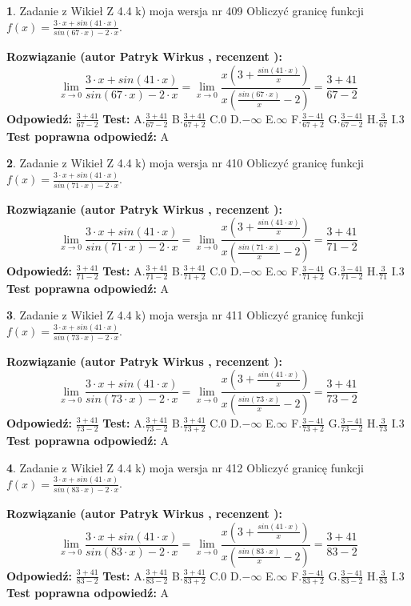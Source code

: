 \documentclass[12pt, a4paper]{article}
\theoremstyle{definition} %
\newtheorem{zad}{}
\newcommand{\zadStart}[1]{\begin{zad}#1\newline}
\newcommand{\zadStop}{\end{zad}}
\newcommand{\rozwStart}[2]{\noindent \textbf{Rozwiązanie (autor #1 , recenzent #2): }\newline}
\newcommand{\rozwStop}{\newline}
\newcommand{\odpStart}{\noindent \textbf{Odpowiedź:}\newline}
\newcommand{\odpStop}{\newline}
\newcommand{\testStart}{\noindent \textbf{Test:}\newline}
\newcommand{\testStop}{\newline}
\newcommand{\kluczStart}{\noindent \textbf{Test poprawna odpowiedź:}\newline}
\newcommand{\kluczStop}{\newline}
\begin{document}
\zadStart{Zadanie z Wikieł Z 4.4 k) moja wersja nr 409}
Obliczyć granicę funkcji $f(x)=\frac{3\cdot x +sin(41\cdot x)}{sin(67\cdot x) -2\cdot x}$.
\zadStop
\rozwStart{Patryk Wirkus}{}
$$\lim\limits_{x\to 0}\frac{3\cdot x +sin(41\cdot x)}{sin(67\cdot x) -2\cdot x}
=\lim\limits_{x\to 0}\frac{x(3+\frac{sin(41\cdot x)}{x})}{x(\frac{sin(67\cdot x)}{x}-2)}
=\frac{3+41}{67-2}$$
\rozwStop
\odpStart
$\frac{3+41}{67-2}$
\odpStop
\testStart
A.$\frac{3+41}{67-2}$
B.$\frac{3+41}{67+2}$
C.$0$
D.$-\infty$
E.$\infty$
F.$\frac{3-41}{67+2}$
G.$\frac{3-41}{67-2}$
H.$\frac{3}{67}$
I.$3$
\testStop
\kluczStart
A
\kluczStop



\zadStart{Zadanie z Wikieł Z 4.4 k) moja wersja nr 410}
Obliczyć granicę funkcji $f(x)=\frac{3\cdot x +sin(41\cdot x)}{sin(71\cdot x) -2\cdot x}$.
\zadStop
\rozwStart{Patryk Wirkus}{}
$$\lim\limits_{x\to 0}\frac{3\cdot x +sin(41\cdot x)}{sin(71\cdot x) -2\cdot x}
=\lim\limits_{x\to 0}\frac{x(3+\frac{sin(41\cdot x)}{x})}{x(\frac{sin(71\cdot x)}{x}-2)}
=\frac{3+41}{71-2}$$
\rozwStop
\odpStart
$\frac{3+41}{71-2}$
\odpStop
\testStart
A.$\frac{3+41}{71-2}$
B.$\frac{3+41}{71+2}$
C.$0$
D.$-\infty$
E.$\infty$
F.$\frac{3-41}{71+2}$
G.$\frac{3-41}{71-2}$
H.$\frac{3}{71}$
I.$3$
\testStop
\kluczStart
A
\kluczStop



\zadStart{Zadanie z Wikieł Z 4.4 k) moja wersja nr 411}
Obliczyć granicę funkcji $f(x)=\frac{3\cdot x +sin(41\cdot x)}{sin(73\cdot x) -2\cdot x}$.
\zadStop
\rozwStart{Patryk Wirkus}{}
$$\lim\limits_{x\to 0}\frac{3\cdot x +sin(41\cdot x)}{sin(73\cdot x) -2\cdot x}
=\lim\limits_{x\to 0}\frac{x(3+\frac{sin(41\cdot x)}{x})}{x(\frac{sin(73\cdot x)}{x}-2)}
=\frac{3+41}{73-2}$$
\rozwStop
\odpStart
$\frac{3+41}{73-2}$
\odpStop
\testStart
A.$\frac{3+41}{73-2}$
B.$\frac{3+41}{73+2}$
C.$0$
D.$-\infty$
E.$\infty$
F.$\frac{3-41}{73+2}$
G.$\frac{3-41}{73-2}$
H.$\frac{3}{73}$
I.$3$
\testStop
\kluczStart
A
\kluczStop



\zadStart{Zadanie z Wikieł Z 4.4 k) moja wersja nr 412}
Obliczyć granicę funkcji $f(x)=\frac{3\cdot x +sin(41\cdot x)}{sin(83\cdot x) -2\cdot x}$.
\zadStop
\rozwStart{Patryk Wirkus}{}
$$\lim\limits_{x\to 0}\frac{3\cdot x +sin(41\cdot x)}{sin(83\cdot x) -2\cdot x}
=\lim\limits_{x\to 0}\frac{x(3+\frac{sin(41\cdot x)}{x})}{x(\frac{sin(83\cdot x)}{x}-2)}
=\frac{3+41}{83-2}$$
\rozwStop
\odpStart
$\frac{3+41}{83-2}$
\odpStop
\testStart
A.$\frac{3+41}{83-2}$
B.$\frac{3+41}{83+2}$
C.$0$
D.$-\infty$
E.$\infty$
F.$\frac{3-41}{83+2}$
G.$\frac{3-41}{83-2}$
H.$\frac{3}{83}$
I.$3$
\testStop
\kluczStart
A
\kluczStop
\end{document}
